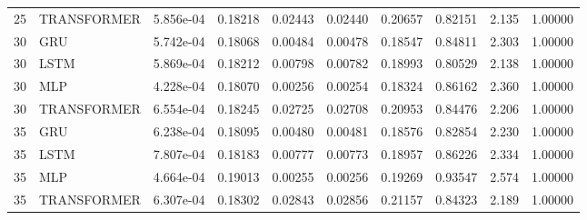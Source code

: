 \begin{table}[t]
{\begin{tabular}{llllllllll}
25 & TRANSFORMER & 5.856e-04 & 0.18218 & 0.02443 & 0.02440 & 0.20657 & 0.82151 & 2.135 & 1.00000 \\
30 & GRU & 5.742e-04 & 0.18068 & 0.00484 & 0.00478 & 0.18547 & 0.84811 & 2.303 & 1.00000 \\
30 & LSTM & 5.869e-04 & 0.18212 & 0.00798 & 0.00782 & 0.18993 & 0.80529 & 2.138 & 1.00000 \\
30 & MLP & 4.228e-04 & 0.18070 & 0.00256 & 0.00254 & 0.18324 & 0.86162 & 2.360 & 1.00000 \\
30 & TRANSFORMER & 6.554e-04 & 0.18245 & 0.02725 & 0.02708 & 0.20953 & 0.84476 & 2.206 & 1.00000 \\
35 & GRU & 6.238e-04 & 0.18095 & 0.00480 & 0.00481 & 0.18576 & 0.82854 & 2.230 & 1.00000 \\
35 & LSTM & 7.807e-04 & 0.18183 & 0.00777 & 0.00773 & 0.18957 & 0.86226 & 2.334 & 1.00000 \\
35 & MLP & 4.664e-04 & 0.19013 & 0.00255 & 0.00256 & 0.19269 & 0.93547 & 2.574 & 1.00000 \\
35 & TRANSFORMER & 6.307e-04 & 0.18302 & 0.02843 & 0.02856 & 0.21157 & 0.84323 & 2.189 & 1.00000 \\
\hline
\end{tabular}%
}
\end{table}